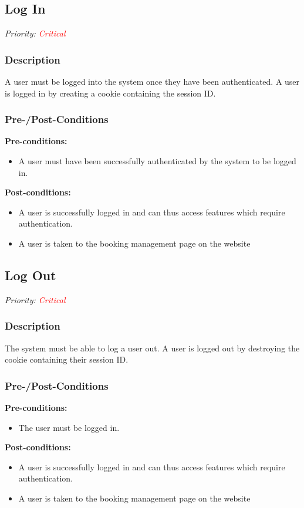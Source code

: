 \subsection{Log In}	
\textit{Priority: \textcolor{red}{Critical}} 

\subsubsection{Description}
A user must be logged into the system once they have been authenticated. A user is logged in by creating a cookie containing the session ID. \\

\subsubsection{Pre-/Post-Conditions}
	\textbf{Pre-conditions:} 
	\begin{itemize}
		\item A user must have been successfully authenticated by the system to be logged in.
	\end{itemize}
	\textbf{Post-conditions:} 
	\begin{itemize}
		\item A user is successfully logged in and can thus access features which require authentication.
		\item A user is taken to the booking management page on the website
	\end{itemize}
	
\subsection{Log Out}	
\textit{Priority: \textcolor{red}{Critical}} 
\subsubsection{Description}
The system must be able to log a user out. A user is logged out by destroying the cookie containing their session ID.\\

\subsubsection{Pre-/Post-Conditions}
	\textbf{Pre-conditions:} 
	\begin{itemize}
		\item The user must be logged in.
	\end{itemize}
	\textbf{Post-conditions:} 
	\begin{itemize}
		\item A user is successfully logged in and can thus access features which require authentication.
		\item A user is taken to the booking management page on the website
	\end{itemize}

